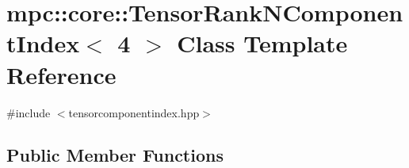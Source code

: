 \hypertarget{classmpc_1_1core_1_1_tensor_rank_n_component_index_3_014_01_4}{}\section{mpc\+:\+:core\+:\+:Tensor\+Rank\+N\+Component\+Index$<$ 4 $>$ Class Template Reference}
\label{classmpc_1_1core_1_1_tensor_rank_n_component_index_3_014_01_4}


{\ttfamily \#include $<$tensorcomponentindex.\+hpp$>$}

\subsection*{Public Member Functions}
